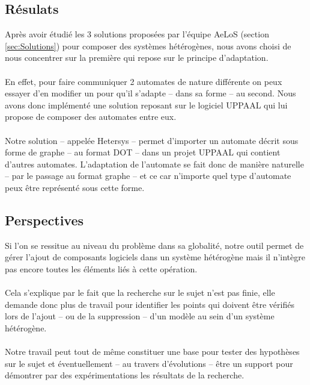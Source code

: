 \documentclass[12pt,a4paper]{report}
\begin{document}
\subsection{Résulats}
Après avoir étudié les 3 solutions proposées par l'équipe AeLoS (section \ref{sec:Solutions}) pour composer des systèmes hétérogènes, 
nous avons choisi de nous concentrer sur la première qui repose sur le principe d'adaptation.
\\\\
En effet, pour faire communiquer 2 automates de nature différente on peux essayer d'en modifier un 
pour qu'il s'adapte -- dans sa forme -- au second. Nous avons donc implémenté une solution reposant sur 
le logiciel UPPAAL qui lui propose de composer des automates entre eux.
\\\\
Notre solution -- appelée Hetersys -- permet d'importer un automate décrit sous forme de graphe -- au format DOT --
dans un projet UPPAAL qui contient d'autres automates. L'adaptation de l'automate se fait donc de manière naturelle
-- par le passage au format graphe -- et ce car n'importe quel type d'automate peux être représenté sous cette forme.

\subsection{Perspectives}
Si l'on se ressitue au niveau du problème dans sa globalité, notre outil permet de gérer l'ajout de composants logiciels
dans un système hétérogène mais il n'intègre pas encore toutes les éléments liés à cette opération. 
\\\\
Cela s'explique par le fait que la recherche sur le sujet n'est pas finie, elle demande donc plus de travail pour identifier
les points qui doivent être vérifiés lors de l'ajout -- ou de la suppression -- d'un modèle au sein d'un système hétérogène.
\\\\
Notre travail peut tout de même constituer une base pour tester des hypothèses sur le sujet et éventuellement  -- au travers
d'évolutions -- être un support pour démontrer par des expérimentations les résultats de la recherche.
\end{document}

